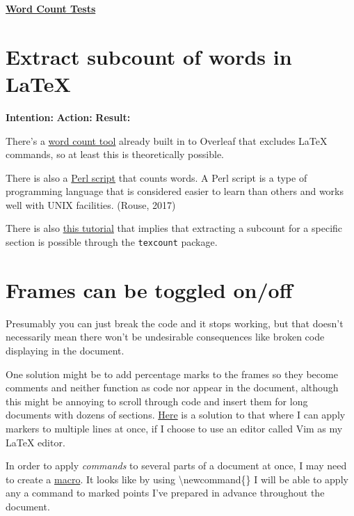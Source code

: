 \documentclass[12pt]{article}
\begin{document}
\newpage

\underline{\textbf{\Large{Word Count Tests}}}
\section{\large Extract subcount of words in LaTeX}

\textbf{Intention:}
\textbf{Action:}
\textbf{Result:}

There's a \href{https://www.overleaf.com/learn/how-to/Is_there_a_way_to_run_a_word_count_that_doesn\%27t_include_LaTeX_commands\%3F}{word count tool} already built in to Overleaf that excludes LaTeX commands, so at least this is theoretically possible.

There is also a \href{https://app.uio.no/ifi/texcount/}{Perl script} that counts words. A Perl script is a type of programming language that is considered easier to learn than others and works well with UNIX facilities. (Rouse, 2017)

There is also \href{https://tex.stackexchange.com/questions/44618/dynamically-count-and-return-number-of-words-in-a-section}{this tutorial} that implies that extracting a subcount for a specific section is possible through the \texttt{texcount} package.


\section{\large Frames can be toggled on/off} 

Presumably you can just break the code and it stops working, but that doesn't necessarily mean there won't be undesirable consequences like broken code displaying in the document.

One solution might be to add percentage marks to the frames so they become comments and neither function as code nor appear in the document, although this might be annoying to scroll through code and insert them for long documents with dozens of sections. \href{https://vim.fandom.com/wiki/Inserting_text_in_multiple_lines}{Here} is a solution to that where I can apply markers to multiple lines at once, if I choose to use an editor called Vim as my LaTeX editor.

In order to apply \textit{commands} to several parts of a document at once, I may need to create a \href{https://en.wikibooks.org/wiki/LaTeX/Macros}{macro}. It looks like by using \textbackslash newcommand\{\} I will be able to apply any a command to marked points I've prepared in advance throughout the document.
\end{document}

